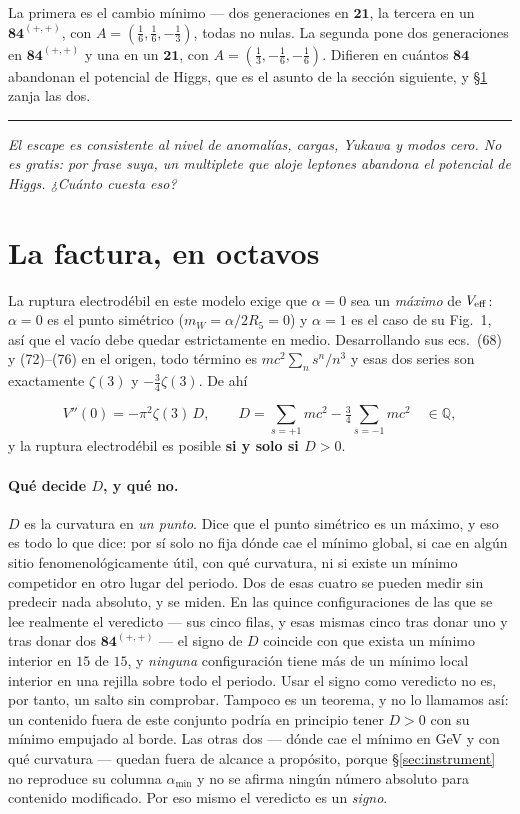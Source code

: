 \documentclass[11pt,a4paper]{article}
\newcommand{\rep}[1]{\mathbf{#1}}
\newcommand{\amin}{\alpha_{\min}}
\newcommand{\bridge}[1]{\par\medskip\noindent
  \textcolor{hdrblue!45}{\rule{2.2cm}{0.6pt}}\;\;\parbox[t]{0.84\textwidth}{\small\itshape
  \textcolor{hdrblue!85}{#1}}\par\medskip}
\newenvironment{keyeq}
  {\begin{center}\setlength{\fboxsep}{9pt}\setlength{\fboxrule}{0.8pt}%
   \begin{lrbox}{\keyeqbox}\begin{minipage}{0.88\textwidth}}
  {\end{minipage}\end{lrbox}%
   \fcolorbox{hdrblue!55}{hdrblue!6}{\usebox{\keyeqbox}}\end{center}}
\begin{document}
La primera es el cambio mínimo --- dos generaciones en $\rep{21}$, la tercera en un
$\rep{84}^{(+,+)}$, con $A=(\tfrac16,\tfrac16,-\tfrac13)$, todas no nulas. La segunda pone dos
generaciones en $\rep{84}^{(+,+)}$ y una en un $\rep{21}$, con $A=(\tfrac13,-\tfrac16,-\tfrac16)$.
Difieren en cuántos $\rep{84}$ abandonan el potencial de Higgs, que es el asunto de la sección
siguiente, y \S\ref{sec:vacuum} zanja las dos.

\bridge{El escape es consistente al nivel de anomalías, cargas, Yukawa y modos cero. No es gratis:
por frase suya, un multiplete que aloje leptones abandona el potencial de Higgs. ¿Cuánto cuesta eso?}

\section{La factura, en octavos}\label{sec:vacuum}

La ruptura electrodébil en este modelo exige que $\alpha=0$ sea un \emph{máximo} de $V_{\rm eff}$:
$\alpha=0$ es el punto simétrico ($m_W=\alpha/2R_5=0$) y $\alpha=1$ es el caso de su Fig.~1, así que
el vacío debe quedar estrictamente en medio. Desarrollando sus ecs.~(68) y (72)--(76) en el origen,
todo término es $m c^2\sum_n s^n/n^3$ y esas dos series son exactamente $\zeta(3)$ y
$-\tfrac34\zeta(3)$. De ahí

\begin{keyeq}
\[
V''(0)=-\pi^2\zeta(3)\,D,\qquad
D=\sum_{s=+1}m c^2-\tfrac34\sum_{s=-1}m c^2\quad\in\mathbb{Q},
\]
y la ruptura electrodébil es posible \textbf{si y solo si $D>0$}.
\end{keyeq}

\paragraph{Qué decide $D$, y qué no.} $D$ es la curvatura en \emph{un punto}. Dice que el punto
simétrico es un máximo, y eso es todo lo que dice: por sí solo no fija dónde cae el mínimo global, si
cae en algún sitio fenomenológicamente útil, con qué curvatura, ni si existe un mínimo competidor en
otro lugar del periodo. Dos de esas cuatro se pueden medir sin predecir nada absoluto, y se miden. En
las quince configuraciones de las que se lee realmente el veredicto --- sus cinco filas, y esas mismas
cinco tras donar uno y tras donar dos $\rep{84}^{(+,+)}$ --- el signo de $D$ coincide con que exista
un mínimo interior en $15$ de $15$, y \emph{ninguna} configuración tiene más de un mínimo local
interior en una rejilla sobre todo el periodo. Usar el signo como veredicto no es, por tanto, un salto
sin comprobar. Tampoco es un teorema, y no lo llamamos así: un contenido fuera de este conjunto podría
en principio tener $D>0$ con su mínimo empujado al borde. Las otras dos --- dónde cae el mínimo en GeV
y con qué curvatura --- quedan fuera de alcance a propósito, porque \S\ref{sec:instrument} no
reproduce su columna $\amin$ y no se afirma ningún número absoluto para contenido modificado. Por eso
mismo el veredicto es un \emph{signo}.
\end{document}
